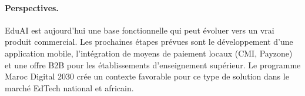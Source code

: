 \paragraph{Perspectives.}
EduAI est aujourd'hui une base fonctionnelle qui peut évoluer vers un vrai produit commercial. Les prochaines étapes prévues sont le développement d'une application mobile, l'intégration de moyens de paiement locaux (CMI, Payzone) et une offre B2B pour les établissements d'enseignement supérieur. Le programme Maroc Digital 2030 crée un contexte favorable pour ce type de solution dans le marché EdTech national et africain.
